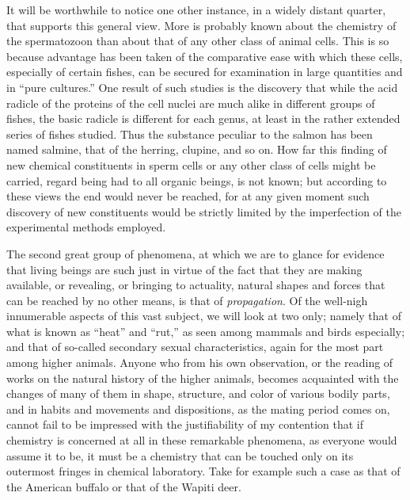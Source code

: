 \documentclass[a4paper, 11pt, oneside, polutonikogreek, english, landscape]{article}
\begin{document}
It will be worthwhile to notice one other instance, in a widely distant quarter, that supports this general view. More is probably known about the chemistry of the spermatozoon than about that of any other class of animal cells. This is so because advantage has been taken of the comparative ease with which these cells, especially of certain fishes, can be secured for examination in large quantities and in ``pure cultures.'' One result of such studies is the discovery that while the acid radicle of the proteins of the cell nuclei are much alike in different groups of fishes, the basic radicle is different for each genus, at least in the rather extended series of fishes studied. Thus the substance peculiar to the salmon has been named salmine, that of the herring, clupine, and so on. How far this finding of new chemical constituents in sperm cells or any other class of cells might be carried, regard being had to all organic beings, is not known; but according to these views the end would never be reached, for at any given moment such discovery of new constituents would be strictly limited by the imperfection of the experimental methods employed.

The second great group of phenomena, at which we are to glance for evidence that living beings are such just in virtue of the fact that they are making available, or revealing, or bringing to actuality, natural shapes and forces that can be reached by no other means, is that of \emph{propagation}. Of the well-nigh innumerable aspects of this vast subject, we will look at two only; namely that of what is known as ``heat'' and ``rut,'' as seen among mammals and birds especially; and that of so-called secondary sexual characteristics, again for the most part among higher animals. Anyone who from his own observation, or the reading of works on the natural history of the higher animals, becomes acquainted with the changes of many of them in shape, structure, and color of various bodily parts, and in habits and movements and dispositions, as the mating period comes on, cannot fail to be impressed with the justifiability of my contention that if chemistry is concerned at all in these remarkable phenomena, as everyone would assume it to be, it must be a chemistry that can be touched only on its outermost fringes in chemical laboratory. Take for example such a case as that of the American buffalo or that of the Wapiti deer.
\end{document}
